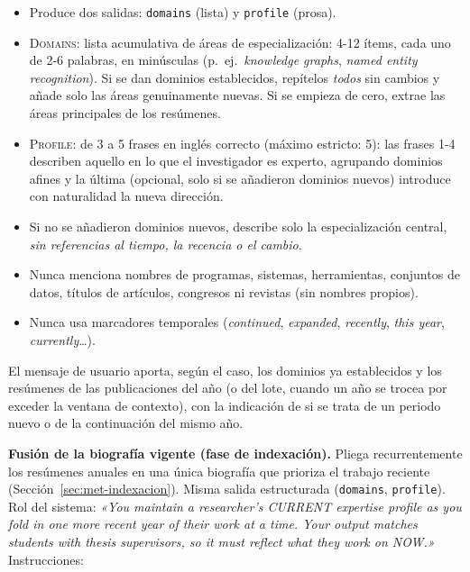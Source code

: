 \begin{itemize}[nosep]
    \item Produce dos salidas: \texttt{domains} (lista) y \texttt{profile} (prosa).
    \item \textsc{Domains}: lista acumulativa de áreas de especialización: 4-12 ítems, cada uno de 2-6 palabras, en minúsculas (p.~ej.\ \emph{knowledge graphs}, \emph{named entity recognition}). Si se dan dominios establecidos, repítelos \emph{todos} sin cambios y añade solo las áreas genuinamente nuevas.
    Si se empieza de cero, extrae las áreas principales de los resúmenes.
    \item \textsc{Profile}: de 3 a 5 frases en inglés correcto (máximo estricto: 5): las frases 1-4 describen aquello en lo que el investigador es experto, agrupando dominios afines y la última (opcional, solo si se añadieron dominios nuevos) introduce con naturalidad la nueva dirección.
    \item Si no se añadieron dominios nuevos, describe solo la especialización central, \emph{sin referencias al tiempo, la recencia o el cambio}.
    \item Nunca menciona nombres de programas, sistemas, herramientas, conjuntos de datos, títulos de artículos, congresos ni revistas (sin nombres propios).
    \item Nunca usa marcadores temporales (\emph{continued}, \emph{expanded}, \emph{recently}, \emph{this year}, \emph{currently}\ldots).
\end{itemize}

El mensaje de usuario aporta, según el caso, los dominios ya establecidos y los resúmenes de las publicaciones del año (o del lote, cuando un año se trocea por exceder la ventana de contexto), con la indicación de si se trata de un periodo nuevo o de la continuación del mismo año.

\textbf{Fusión de la biografía vigente (fase de indexación).}
Pliega recurrentemente los resúmenes anuales en una única biografía que prioriza el trabajo reciente (Sección~\ref{sec:met-indexacion}).
Misma salida estructurada (\texttt{domains}, \texttt{profile}).
Rol del sistema: \emph{«You maintain a researcher's CURRENT expertise profile as you fold in one more recent year of their work at a time. Your output matches students with thesis supervisors, so it must reflect what they work on NOW.»}
Instrucciones:

